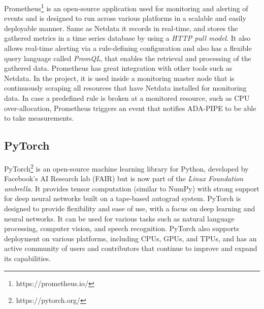     Prometheus\footnote{https://prometheus.io/} is an open-source application used for monitoring and alerting of events and is designed to run across various platforms in a scalable and easily deployable manner.
    Same as Netdata it records in real-time, and stores the gathered metrics in a time series database by using a \emph{HTTP pull model}. It also allows real-time alerting via a rule-defining configuration and also has a flexible query language called \emph{PromQL}, that enables the retrieval and processing of the gathered data. Prometheus has great integration with other tools such as Netdata.
    In the project, it is used inside a monitoring master node that is continuously scraping all resources that have Netdata installed for monitoring data. In case a predefined rule is broken at a monitored resource, such as CPU over-allocation, Prometheus triggers an event that notifies ADA-PIPE to be able to take measurements.



  \subsection{PyTorch}
  \label{sec:pytorch-evaluation-setup}
    PyTorch\footnote{https://pytorch.org/} is an open-source machine learning library for Python, developed by Facebook's AI Research lab (FAIR) but is now part of the \emph{Linux Foundation umbrella}. It provides tensor computation (similar to NumPy) with strong support for deep neural networks built on a tape-based autograd system. PyTorch is designed to provide flexibility and ease of use, with a focus on deep learning and neural networks. It can be used for various tasks such as natural language processing, computer vision, and speech recognition.
    PyTorch also supports deployment on various platforms, including CPUs, GPUs, and TPUs, and has an active community of users and contributors that continue to improve and expand its capabilities.
  




  



